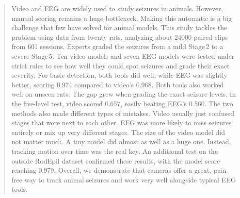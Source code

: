 \begin{abstract}
Video and EEG are widely used to study seizures in animals. However, manual
scoring remains a huge bottleneck. Making this automatic is a big challenge that
few have solved for animal models. This study tackles the problem using data from
twenty rats, analyzing about 24000 paired clips from 601 sessions. Experts graded
the seizures from a mild Stage\,2 to a severe Stage\,5. Ten video models and seven
EEG models were tested under strict rules to see how well they could spot seizures
and grade their exact severity. For basic detection, both tools did well, while
EEG was slightly better, scoring 0.974 compared to video's 0.968. Both tools also
worked well on unseen rats. The gap grew when grading the exact seizure levels. In
the five-level test, video scored 0.657, easily beating EEG's 0.560. The two
methods also made different types of mistakes. Video usually just confused stages
that were next to each other. EEG was more likely to miss seizures entirely or mix
up very different stages. The size of the video model did not matter much. A tiny
model did almost as well as a huge one. Instead, tracking motion over time was the
real key. An additional test on the outside RodEpil dataset confirmed these
results, with the model score reaching 0.979. Overall, we demonstrate that cameras
offer a great, pain-free way to track animal seizures and work very well alongside
typical EEG tools.
\end{abstract}
